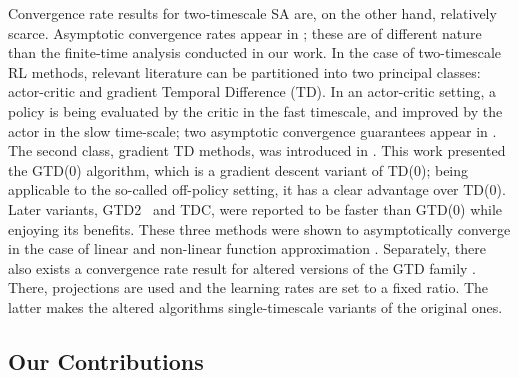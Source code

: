 \documentclass[usenames,dvipsnames,final,12pt]{colt2018} %
\newcommand{\gal}[1]{#1}
\newcommand{\gugan}[1]{#1}
\begin{document}
\gal{Convergence rate results for two-timescale SA are, on the other hand, relatively scarce. Asymptotic convergence rates appear in \citep{spall1992multivariate,gerencser1997rate,konda2004convergence,mokkadem2006convergence}; these are of different nature than the finite-time analysis conducted in our work}. \gal{In the case of two-timescale RL methods, relevant literature} can be partitioned into two principal classes: actor-critic and gradient Temporal Difference (TD). In an actor-critic setting, a policy is being evaluated by the critic in the fast timescale, and improved by the actor in the slow time-scale; \gal{two asymptotic convergence guarantees appear in} \citep{peters2008natural,bhatnagar2009natural}. The second class, gradient TD methods, was introduced in \citep{sutton2009convergent}. This work presented the GTD(0) algorithm, which is \gal{a} gradient descent \gal{variant} of TD(0); being applicable to the so-called off-policy setting, it has a clear advantage over TD(0). Later variants, GTD2 \ and TDC, were reported to be faster than GTD(0) while enjoying its benefits. \gugan{These three methods} were shown to \gugan{asymptotically} converge in the case of linear and non-linear function approximation \citep{sutton2009convergent, sutton2009fast, bhatnagar2009convergent}.
\gugan{Separately,} there also exists a convergence rate result for altered versions of the GTD family \citep{liu2015finite}. There\gal{,} projections are used
and the learning rates are set to a fixed ratio. The latter makes the altered algorithms single-timescale variants of the original ones.


\subsection{Our Contributions}
\end{document}
